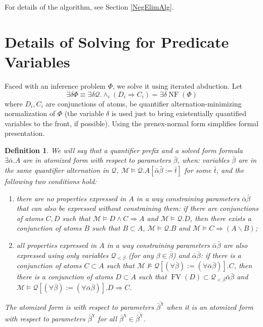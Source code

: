 \documentclass{article}
\newcommand{\assign}{:=}
\newcommand{\tmem}[1]{{\em #1\/}}
\newcommand{\tmop}[1]{\ensuremath{\operatorname{#1}}}
\newtheorem{definition}{Definition}
{\theorembodyfont{\rmfamily}\newtheorem{example}{Example}}
\begin{document}
For details of the algorithm, see Section \ref{NegElimAlg}.

\section{Details of Solving for Predicate Variables}\label{PredVarMain}

Faced with an inference problem $\Phi$, we solve it using iterated abduction.
Let
\[ \exists \delta \Phi \equiv \exists \delta \mathcal{Q}. \wedge_i (D_i
   \Rightarrow C_i) = \exists \delta \tmop{NF} (\Phi) \]
where $D_i, C_i$ are conjunctions of atoms, be quantifier
alternation-minimizing normalization of $\Phi$ (the variable $\delta$ is used
just to bring existentially quantified variables to the front, if possible).
Using the prenex-normal form simplifies formal presentation.

\begin{definition}
  \label{AtomizedForm}We will say that a quantifier prefix and a solved form
  formula $\exists \bar{\alpha} .A$ are in {\tmem{atomized form with respect
  to parameters $\bar{\beta}$}}, when: variables $\bar{\beta}$ are in the same
  quantifier alternation in $\mathcal{Q}$, $\mathcal{M} \vDash \mathcal{Q}.A
  [\bar{\alpha} \bar{\beta} \assign \bar{t}]$ for some $\bar{t}$, and the
  following two conditions hold:
  \begin{enumerate}
    \item there are no properties expressed in $A$ in a way constraining
    parameters $\bar{\alpha} \bar{\beta}$ that can also be expressed without
    constraining them: if there are conjunctions of atoms $C, D$ such that
    $\mathcal{M} \vDash D \wedge C \Rightarrow A$ and $\mathcal{M} \vDash
    \mathcal{Q}.D$, then there exists a conjunction of atoms $B$ such that $B
    \subset A$, $\mathcal{M} \vDash \mathcal{Q}.B$ and $\mathcal{M} \vDash C
    \Rightarrow (A\backslash B)$;
    
    \item all properties expressed in $A$ in a way constraining parameters
    $\bar{\alpha} \bar{\beta}$ are also expressed using only variables
    $\mathcal{Q}_{< \beta}$ (for any $\beta \in \bar{\beta}$) and
    $\bar{\alpha} \bar{\beta}$: if there is a conjunction of atoms $C \subset
    A$ such that $\mathcal{M} \nvDash \mathcal{Q} [(\forall \bar{\beta})
    \assign (\forall \bar{\alpha} \bar{\beta})] .C$, then there is a
    conjunction of atoms $D \subset A$ such that $\tmop{FV} (D) \subset
    \mathcal{Q}_{< \beta} \bar{\alpha} \bar{\beta}$ and $\mathcal{M} \vDash
    \mathcal{Q} [(\forall \bar{\beta}) \assign (\forall \bar{\alpha}
    \bar{\beta})] .D \Rightarrow C$.
  \end{enumerate}
  The atomized form is {\tmem{with respect to parameters
  $\overline{\bar{\beta}^{\chi}}$}} when it is an atomized form with respect
  to parameters $\bar{\beta}^{\chi}$ for all $\bar{\beta}^{\chi} \in
  \overline{\bar{\beta}^{\chi}}$.
\end{definition}
\end{document}
